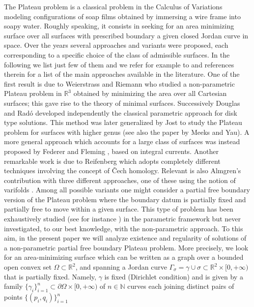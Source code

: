 \documentclass[JEP,XML,SOM,Unicode, NoFloatCountersInSection,published]{cedram}
\newcommand{\R}{\mathbb{R}}
\let\Om\Omega
\theoremstyle{definition}
\begin{document}
The Plateau problem is a classical problem in the Calculus of Variations modeling configurations of soap films obtained by immersing a wire frame into soapy water. Roughly speaking, it consists in seeking for an area minimizing surface over all surfaces with prescribed boundary a given closed Jordan curve in space.
Over the years several approaches and variants were proposed, each corresponding to a specific choice of the class of admissible surfaces. In the following we list just few of them and we refer for example to \cite{Harrison-Pugh} and references therein for a list of the main approaches available in the literature.
One of the first result is due to Weierstrass and Riemann who studied a non-parametric Plateau problem in $\R^3$
obtained by minimizing the area over all Cartesian surfaces; this gave rise to the theory of minimal surfaces.
Successively Douglas and Radó developed independently \cite{Douglas,Rado} the classical parametric approach for disk type solutions. This method was later generalized by Jost \cite{Jost} to study the Plateau problem for surfaces with higher genus (see also
the paper \cite{MY} by Meeks and Yau).
A more general approach which accounts for a large class of surfaces was instead proposed by Federer and Fleming \cite{FedererFleming},
based on integral currents. Another remarkable work is due to Reifenberg \cite{Reifenberg} which adopts completely different techniques involving the concept of Čech homology. Relevant is also Almgren's contribution with three different approaches, one of these using the notion of varifolds \cite{Almgren65}.
Among all possible variants one might consider a partial free boundary version of the Plateau problem where the boundary datum is partially
fixed and partially free to move within a given surface.
This type of problem has been exhaustively studied (see for instance \cite{DHS}) in the parametric framework but never investigated,
to our best knowledge, with the non-parametric approach. To this aim, in the present paper we will analyze existence and regularity of solutions of a non-parametric partial free boundary Plateau problem.
More precisely,
we look for an area-minimizing surface
which can be written as a graph over a bounded open convex set
$\Omega\subset \R^2$,
and spanning
a Jordan curve $\Gamma_\sigma=\gamma\cup \sigma \subset \R^2 \times [0,+\infty)$ that is partially fixed.
Namely, $\gamma$ is fixed (Dirichlet condition) and
is given by a family
$\{\gamma_i\}_{i=1}^n\subset\partial \Om\times [0,+\infty)$
of $n\in\mathbb{N}$
curves
each joining distinct pairs of points $\{(p_i,q_i)\}_{i=1}^n$
\end{document}
